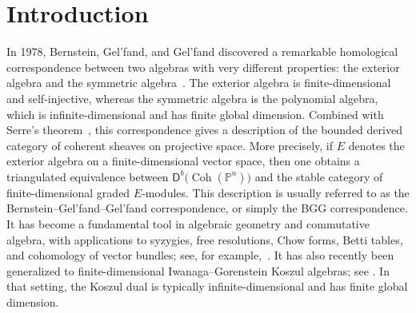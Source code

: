\documentclass[11pt]{article}
\theoremstyle{definition}
\theoremstyle{remark}
\begin{document}
\section{Introduction}
In 1978, Bernstein, Gel'fand, and Gel'fand discovered a remarkable homological correspondence between two algebras with very different properties: the exterior algebra and the symmetric algebra~\cite{6}. The exterior algebra is finite-dimensional and self-injective, whereas the symmetric algebra is the polynomial algebra, which is infinite-dimensional and has finite global dimension. Combined with Serre's theorem~\cite{38}, this correspondence gives a description of the bounded derived category of coherent sheaves on projective space. More precisely, if \(E\) denotes the exterior algebra on a finite-dimensional vector space, then one obtains a triangulated equivalence between \(\mathsf{D}^{b}\bigl(\operatorname{Coh}(\mathbb{P}^{n})\bigr)\) and the stable category of finite-dimensional graded \(E\)-modules. This description is usually referred to as the Bernstein--Gel'fand--Gel'fand correspondence, or simply the BGG correspondence. It has become a fundamental tool in algebraic geometry and commutative algebra, with applications to syzygies, free resolutions, Chow forms, Betti tables, and cohomology of vector bundles; see, for example,~\cite{17,20,21}. It has also recently been generalized to finite-dimensional Iwanaga--Gorenstein Koszul algebras; see \cite[Theorem~3.17]{8}. In that setting, the Koszul dual is typically infinite-dimensional and has finite global dimension.

\medskip 
\end{document}
